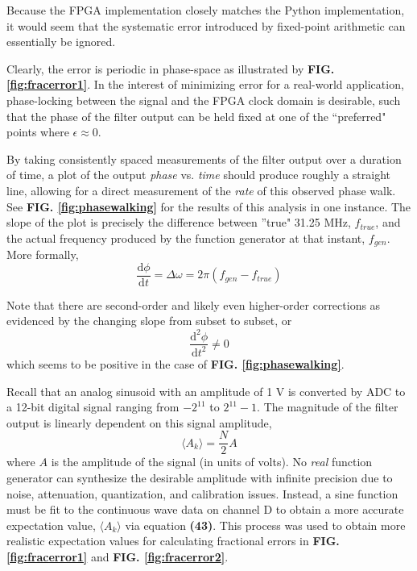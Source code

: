 \documentclass[reprint,amsmath,amssymb,aps,pra]{revtex4-2}
\begin{document}
Because the FPGA implementation closely matches the Python implementation, it would seem that the systematic error introduced by fixed-point arithmetic can essentially be ignored.

Clearly, the error is periodic in phase-space as illustrated by \textbf{FIG. \ref{fig:fracerror1}}. In the interest of minimizing error for a real-world application, phase-locking between the signal and the FPGA clock domain is desirable, such that the phase of the filter output can be held fixed at one of the ``preferred" points where $\epsilon \approx 0$.

By taking consistently spaced measurements of the filter output over a duration of time, a plot of the output \textit{phase} vs. \textit{time} should produce roughly a straight line, allowing for a direct measurement of the \textit{rate} of this observed phase walk. See \textbf{FIG. \ref{fig:phasewalking}} for the results of this analysis in one instance. The slope of the plot is precisely the difference between ''true" 31.25 MHz, $f_{true}$, and the actual frequency produced by the function generator at that instant, $f_{gen}$. More formally,
\begin{equation}
    \frac{\mathrm{d}\phi}{\mathrm{d}t} = \Delta \omega = 2\pi\left(f_{gen}-f_{true} \right)
\end{equation}

Note that there are second-order and likely even higher-order corrections as evidenced by the changing slope from subset to subset, or
\begin{equation}
    \frac{\mathrm{d}^2 \phi}{\mathrm{d}t^2} \neq 0
\end{equation}
which seems to be positive in the case of \textbf{FIG. \ref{fig:phasewalking}}.

Recall that an analog sinusoid with an amplitude of 1 V is converted by ADC to a 12-bit digital signal ranging from $-2^{11}$ to $2^{11} - 1$. The magnitude of the filter output is linearly dependent on this signal amplitude,
\begin{equation}
    \langle A_k \rangle = \frac{N}{2}A
\end{equation}
where $A$ is the amplitude of the signal (in units of volts). No \textit{real} function generator can synthesize the desirable amplitude with infinite precision due to noise, attenuation, quantization, and calibration issues. Instead, a sine function must be fit to the continuous wave data on channel D to obtain a more accurate expectation value, $\langle A_k \rangle$ via equation \textbf{(43)}. This process was used to obtain more realistic expectation values for calculating fractional errors in \textbf{FIG. \ref{fig:fracerror1}} and \textbf{FIG. \ref{fig:fracerror2}}.
\end{document}

